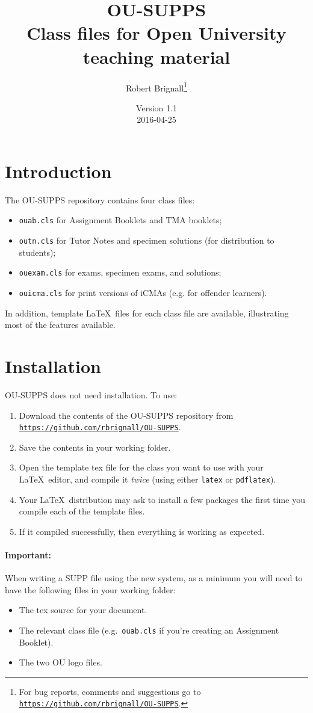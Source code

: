 \documentclass[a4paper]{ltxguide}
\title{\textsf{OU-SUPPS}\\Class files for Open University teaching material}
\author{Robert Brignall\footnote{For bug reports, comments and
suggestions go to \href{https://github.com/rbrignall/OU-SUPPS}%
{\texttt{https://github.com/rbrignall/OU-SUPPS}}.}}
\date{Version 1.1\\2016-04-25}
\newcommand\3{\unskip\enspace\fbox{\fontsize{4}{4}\selectfont NEW 3.0}}
\begin{document}
\maketitle

\tableofcontents

\section{Introduction}

The \textsf{OU-SUPPS} repository contains four class files:
\begin{itemize}
\item \texttt{ouab.cls} for Assignment Booklets and TMA booklets;
\item \texttt{outn.cls} for Tutor Notes and specimen solutions (for distribution to students);
\item \texttt{ouexam.cls} for exams, specimen exams, and solutions;
\item \texttt{ouicma.cls} for print versions of iCMAs (e.g. for offender learners).
\end{itemize}

In addition, template \LaTeX\ files for each class file are available, illustrating most of the features available.

\section{Installation}

\textsf{OU-SUPPS} does not need installation. To use:

\begin{enumerate}
\item Download the contents of the \textsf{OU-SUPPS} repository from \href{https://github.com/rbrignall/OU-SUPPS}%
{\texttt{https://github.com/rbrignall/OU-SUPPS}}.
\item Save the contents in your working folder.
\item Open the template tex file for the class you want to use with your \LaTeX\ editor, and compile it \emph{twice} (using either \texttt{latex} or \texttt{pdflatex}). 
\item Your \LaTeX\ distribution may ask to install a few packages the first time you compile each of the template files.
\item If it compiled successfully, then everything is working as expected.
\end{enumerate}

\paragraph{Important:} When writing a SUPP file using the new system, as a minimum you will need to have the following files in your working folder:
\begin{itemize}
\item The tex source for your document.
\item The relevant class file (e.g.\ \texttt{ouab.cls} if you're creating an Assignment Booklet).
\item The two OU logo files.
\end{itemize}
\end{document}
